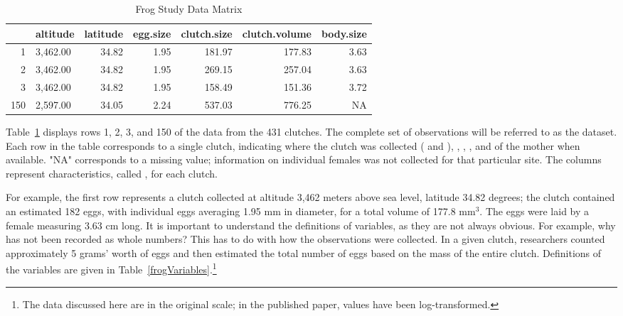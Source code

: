 \begin{doublespace}
\begin{table}[ht]
\centering
\begin{tabular}{rlrrrrr}
  \hline
 & altitude & latitude & egg.size & clutch.size & clutch.volume & body.size \\ 
  \hline
1 & 3,462.00 & 34.82 & 1.95 & 181.97 & 177.83 & 3.63 \\ 
  2 & 3,462.00 & 34.82 & 1.95 & 269.15 & 257.04 & 3.63 \\ 
  3 & 3,462.00 & 34.82 & 1.95 & 158.49 & 151.36 & 3.72 \\ 
  150 & 2,597.00 & 34.05 & 2.24 & 537.03 & 776.25 & NA \\ 
   \hline
\end{tabular}
\caption{Frog Study Data Matrix} 
\label{frogDF}
\end{table}

Table~\ref{frogDF} displays rows 1, 2, 3, and 150 of the data from the 431 clutches. The complete set of observations will be referred to as the  dataset. Each row in the table corresponds to a single clutch, indicating where the clutch was collected ( and ), , , , and  of the mother when available. "NA" corresponds to a missing value; information on individual females was not collected for that particular site. The columns represent characteristics, called , for each clutch.

For example, the first row represents a clutch collected at altitude 3,462 meters above sea level, latitude 34.82 degrees; the clutch contained an estimated 182 eggs, with individual eggs averaging 1.95 mm in diameter, for a total volume of 177.8 mm$^{3}$. The eggs were laid by a female measuring 3.63 cm long. It is important to understand the definitions of variables, as they are not always obvious. For example, why has  not been recorded as whole numbers? This has to do with how the observations were collected. In a given clutch, researchers counted approximately 5 grams' worth of eggs and then estimated the total number of eggs based on the mass of the entire clutch. Definitions of the variables are given in Table~\ref{frogVariables}.\footnote{The data discussed here are in the original scale; in the published paper, values have been log-transformed.}


\end{doublespace}
